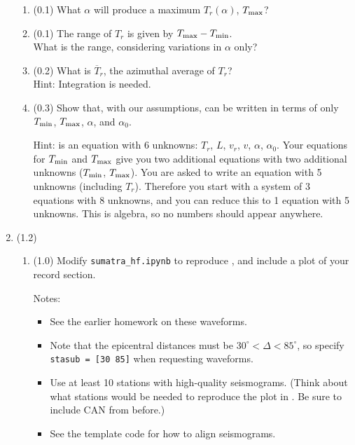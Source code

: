 \documentclass[11pt,titlepage,fleqn]{article}
\begin{document}
\begin{enumerate}
\begin{enumerate}
\item (0.1) What $\alpha$ will produce a maximum $T_r(\alpha)$, $T_{\rm max}$?
\item (0.1) The range of $T_r$ is given by $T_{\rm max} - T_{\rm min}$. \\
What is the range, considering variations in $\alpha$ only?
\item (0.2) What is $\overline{T}_r$, the azimuthal average of $T_r$? \\
Hint: Integration is needed.
\item (0.3) Show that, with our assumptions,  can be written in terms of only $T_{\rm min}$, $T_{\rm max}$, $\alpha$, and $\alpha_0$.

Hint:  is an equation with 6 unknowns: $T_r$, $L$, $v_r$, $v$, $\alpha$, $\alpha_0$. Your equations for $T_{\rm min}$ and $T_{\rm max}$ give you two additional equations with two additional unknowns ($T_{\rm min}$, $T_{\rm max}$). You are asked to write an equation with 5 unknowns (including $T_r$). Therefore you start with a system of 3 equations with 8 unknowns, and you can reduce this to 1 equation with 5 unknowns. This is algebra, so no numbers should appear anywhere.

\end{enumerate}


\item (1.2) 
\begin{enumerate}
\item (1.0) Modify \verb+sumatra_hf.ipynb+ to reproduce \citet[][Figure~1d]{Ni2005}, and include a plot of your record section.

Notes:
%
\begin{itemize}
\item See the earlier homework on these waveforms.

\item Note that the epicentral distances must be $30^\circ < \Delta < 85^\circ$, so specify \\
\verb+stasub = [30 85]+ when requesting waveforms.

\item Use at least 10 stations with high-quality seismograms. (Think about what stations would be needed to reproduce the plot in \citet{Ni2005}. Be sure to include CAN from before.)

\item See the template code for how to align seismograms.


\end{itemize}
\end{enumerate}
\end{enumerate}
\end{document}
